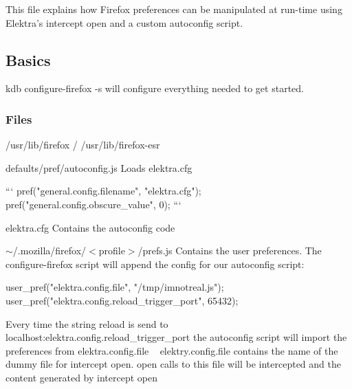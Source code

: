 This file explains how Firefox preferences can be manipulated at run-\/time using Elektra’s intercept open and a custom autoconfig script.

\subsection*{Basics}

{\ttfamily kdb configure-\/firefox -\/s} will configure everything needed to get started.

\subsubsection*{Files}


\begin{DoxyItemize}
\item {\ttfamily /usr/lib/firefox} / {\ttfamily /usr/lib/firefox-\/esr}
\begin{DoxyItemize}
\item {\ttfamily defaults/pref/autoconfig.\+js} Loads {\ttfamily elektra.\+cfg}
\end{DoxyItemize}
\end{DoxyItemize}

\begin{DoxyVerb} ```
 pref("general.config.filename", "elektra.cfg");
 pref("general.config.obscure_value", 0);
```
\end{DoxyVerb}

\begin{DoxyItemize}
\item {\ttfamily elektra.\+cfg} Contains the autoconfig code
\end{DoxyItemize}

{\ttfamily $\sim$/.mozilla/firefox/$<$profile$>$/prefs.js} Contains the user preferences. The configure-\/firefox script will append the config for our autoconfig script\+:


\begin{DoxyCode}
user\_pref("elektra.config.file", "/tmp/imnotreal.js");
user\_pref("elektra.config.reload\_trigger\_port", 65432);
\end{DoxyCode}


Every time the string {\ttfamily reload} is send to localhost\+:{\ttfamily elektra.\+config.\+reload\+\_\+trigger\+\_\+port} the autoconfig script will import the preferences from {\ttfamily elektra.\+config.\+file} ~\newline
 {\ttfamily elektry.\+config.\+file} contains the name of the dummy file for {\ttfamily intercept open}. {\ttfamily open} calls to this file will be intercepted and the content generated by {\ttfamily intercept open}

